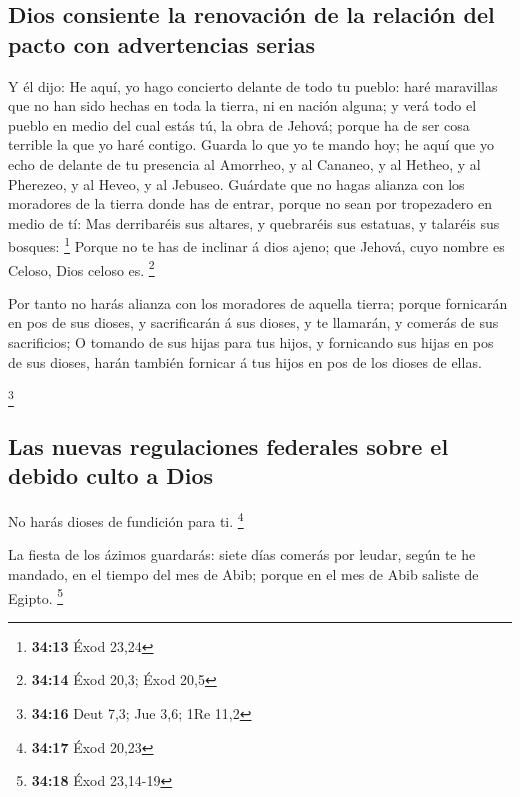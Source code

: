 \hypertarget{dios-consiente-la-renovaciuxf3n-de-la-relaciuxf3n-del-pacto-con-advertencias-serias}{%
\subsection{Dios consiente la renovación de la relación del pacto con
advertencias
serias}\label{dios-consiente-la-renovaciuxf3n-de-la-relaciuxf3n-del-pacto-con-advertencias-serias}}

 Y él dijo: He aquí, yo hago concierto delante de todo tu
pueblo: haré maravillas que no han sido hechas en toda la tierra, ni en
nación alguna; y verá todo el pueblo en medio del cual estás tú, la obra
de Jehová; porque ha de ser cosa terrible la que yo haré contigo.
 Guarda lo que yo te mando hoy; he aquí que yo echo de
delante de tu presencia al Amorrheo, y al Cananeo, y al Hetheo, y al
Pherezeo, y al Heveo, y al Jebuseo.  Guárdate que no
hagas alianza con los moradores de la tierra donde has de entrar, porque
no sean por tropezadero en medio de tí:  Mas derribaréis
sus altares, y quebraréis sus estatuas, y talaréis sus bosques:
\footnote{\textbf{34:13} Éxod 23,24}  Porque no te has de
inclinar á dios ajeno; que Jehová, cuyo nombre es Celoso, Dios celoso
es. \footnote{\textbf{34:14} Éxod 20,3; Éxod 20,5}

 Por tanto no harás alianza con los moradores de aquella
tierra; porque fornicarán en pos de sus dioses, y sacrificarán á sus
dioses, y te llamarán, y comerás de sus sacrificios;  O
tomando de sus hijas para tus hijos, y fornicando sus hijas en pos de
sus dioses, harán también fornicar á tus hijos en pos de los dioses de
ellas.

\footnote{\textbf{34:16} Deut 7,3; Jue 3,6; 1Re 11,2}

\hypertarget{las-nuevas-regulaciones-federales-sobre-el-debido-culto-a-dios}{%
\subsection{Las nuevas regulaciones federales sobre el debido culto a
Dios}\label{las-nuevas-regulaciones-federales-sobre-el-debido-culto-a-dios}}

 No harás dioses de fundición para ti. \footnote{\textbf{34:17}
  Éxod 20,23}

 La fiesta de los ázimos guardarás: siete días comerás
por leudar, según te he mandado, en el tiempo del mes de Abib; porque en
el mes de Abib saliste de Egipto. \footnote{\textbf{34:18} Éxod 23,14-19}

